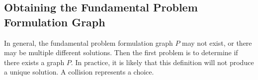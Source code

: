 \subsection{Obtaining the Fundamental Problem Formulation Graph}
In general, the fundamental problem formulation graph $P$ may not exist, or there may be multiple different solutions. Then the first problem is to determine if there exists a graph $P$.
In practice, it is likely that this definition will not produce a unique solution. 
A collision represents a choice.





